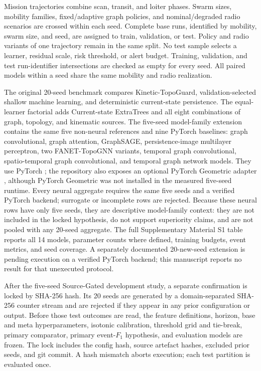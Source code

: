 \documentclass[final,5p,times,twocolumn]{elsarticle}
\begin{document}
Mission trajectories combine scan, transit, and loiter phases. Swarm sizes, mobility
families, fixed/adaptive graph policies, and nominal/degraded radio scenarios are crossed
within each seed. Complete base runs, identified by mobility, swarm size, and seed, are
assigned to train, validation, or test. Policy and radio variants of one trajectory remain
in the same split. No test sample selects a learner, residual scale, risk threshold, or
alert budget. Training, validation, and test run-identifier intersections are checked as
empty for every seed. All paired models within a seed share the same mobility and radio
realization.

The original 20-seed benchmark compares Kinetic-TopoGuard, validation-selected shallow
machine learning, and deterministic current-state persistence. The equal-learner factorial
adds Current-state ExtraTrees and all eight combinations of graph, topology, and kinematic
sources. The five-seed model-family extension contains the same five non-neural references
and nine PyTorch baselines: graph convolutional, graph attention, GraphSAGE,
persistence-image multilayer perceptron, two FANET-TopoGNN variants, temporal graph
convolutional, spatio-temporal graph convolutional, and temporal graph network models.
They use PyTorch \cite{paszke2019pytorch}; the repository also exposes an optional
PyTorch Geometric adapter \cite{fey2019fast}, although PyTorch Geometric was not installed
in the measured five-seed runtime. Every neural aggregate requires the same five seeds and a verified PyTorch backend;
surrogate or incomplete rows are rejected. Because these neural rows have only five seeds,
they are descriptive model-family context: they are not included in the locked hypothesis,
do not support superiority claims, and are not pooled with any 20-seed aggregate. The full
Supplementary Material S1 table reports all 14 models, parameter counts where defined,
training budgets, event metrics, and seed coverage. A separately documented 20-new-seed
extension is pending execution on a verified PyTorch backend; this manuscript reports no
result for that unexecuted protocol.

After the five-seed Source-Gated development study, a separate confirmation is locked by
SHA-256 hash. Its 20 seeds are generated by a domain-separated SHA-256 counter stream and
are rejected if they appear in any prior configuration or output. Before those test
outcomes are read, the feature definitions, horizon, base and meta hyperparameters,
isotonic calibration, threshold grid and tie-break, primary comparator, primary event-$F_1$
hypothesis, and evaluation models are frozen. The lock includes the config hash, source
artefact hashes, excluded prior seeds, and git commit. A hash mismatch aborts execution;
each test partition is evaluated once.
\end{document}
